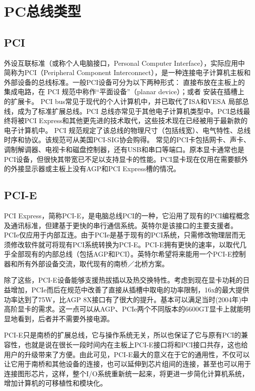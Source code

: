 \section{PC总线类型} 

\subsection{PCI}
外设互联标准（或称个人电脑接口，Personal Computer Interface），实际应用中简称为PCI（Peripheral Component Interconnect），是一种连接电子计算机主板和外部设备的总线标准。一般PCI设备可分为以下两种形式：
直接布放在主板上的集成电路，在 PCI 规范中称作“平面设备”（planar device）；或者
安装在插槽上的扩展卡。
PCI bus常见于现代的个人计算机中，并已取代了ISA和VESA 局部总线，成为了标准扩展总线。PCI 总线亦常见于其他电子计算机类型中。PCI总线最终将被PCI Express和其他更先进的技术取代，这些技术现在已经被用于最新款的电子计算机中。
PCI 规范规定了该总线的物理尺寸（包括线宽）、电气特性、总线时序和协议。该规范可从美国PCI-SIG协会购得。
常见的PCI卡包括网卡、声卡、调制解调器、电视卡和磁盘控制器，还有USB和串口等端口。原本显卡通常也是PCI设备，但很快其带宽已不足以支持显卡的性能。PCI显卡现在仅用在需要额外的外接显示器或主板上没有AGP和PCI Express槽的情况。

\subsection{PCI-E}
PCI Express，简称PCI-E，是电脑总线PCI的一种，它沿用了现有的PCI编程概念及通讯标准，但建基于更快的串行通信系统。英特尔是该接口的主要支援者。PCIe仅应用于内部互连。由于PCIe是基于现有的PCI系统，只需修改物理层而无须修改软件就可将现有PCI系统转换为PCI-E。PCI-E拥有更快的速率，以取代几乎全部现有的内部总线（包括AGP和PCI）。英特尔希望将来能用一个PCI-E控制器和所有外部设备交流，取代现有的南桥／北桥方案。

除了这些，PCI-E设备能够支援热拔插以及热交换特性。考虑到现在显卡功耗的日益增加，PCIe而后在规范中改善了直接从插槽中取电的功率限制，16x的最大提供功率达到了75W，比AGP 8X接口有了很大的提升。基本可以满足当时(2004年)中高阶显卡的需求。这一点可以从AGP、PCIe两个不同版本的6600GT显卡上就能明显地看到，后者并不需要外接电源。

PCI-E只是南桥的扩展总线，它与操作系统无关，所以也保证了它与原有PCI的兼容性，也就是说在很长一段时间内在主板上PCI-E接口将和PCI接口共存，这也给用户的升级带来了方便。由此可见，PCI-E最大的意义在于它的通用性，不仅可以让它用于南桥和其他设备的连接，也可以延伸到芯片组间的连接，甚至也可以用于连接图形芯片，这样，整个I/O系统重新统一起来，将更进一步简化计算机系统，增加计算机的可移植性和模块化。

